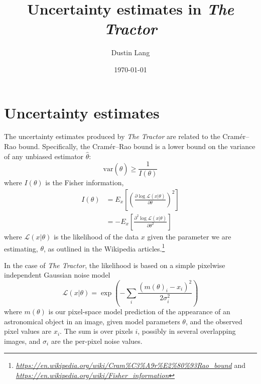 \documentclass[letterpaper]{article}
\newcommand{\likelihood}{\mathcal{L}}
\newcommand{\dd}{\partial}
\newcommand{\var}{\textrm{var}}
\newcommand{\niceurl}[1]{\mbox{\href{#1}{\textsl{#1}}}}
\begin{document}
\title{Uncertainty estimates in \emph{The Tractor}}
\author{Dustin Lang}
\date{\today}

\maketitle

\section{Uncertainty estimates}

The uncertainty estimates produced by \emph{The Tractor} are related
to the Cram\'er--Rao bound.  Specifically, the Cram\'er--Rao bound is
a lower bound on the variance of any unbiased estimator $\hat{\theta}$:
\begin{equation}
\var(\hat{\theta}) \ge \displaystyle\frac{1}{I(\theta)}
\end{equation}
where $I(\theta)$ is the Fisher information,
\begin{align}
  I(\theta) &= E_{x}\left[ \left( \frac{\dd \log \likelihood(x | \theta)}{\dd \theta} \right)^2 \right] \\
  & = - E_{x}\left[ \frac{\dd^2 \log \likelihood(x | \theta)}{\dd \theta^2} \right]
\end{align}
where $\likelihood(x | \theta)$ is the likelihood of the data $x$ given
the parameter we are estimating, $\theta$,
as outlined in the Wikipedia articles.\footnote{%
  \niceurl{https://en.wikipedia.org/wiki/Cram\%C3\%A9r\%E2\%80\%93Rao\_bound}
  and
  \niceurl{https://en.wikipedia.org/wiki/Fisher\_information}}


In the case of \emph{The Tractor}, the likelihood is based on a simple
pixelwise independent Gaussian noise model
\begin{equation}
\likelihood(x | \theta) = \exp\left(-\sum_i \frac{(m(\theta)_i - x_i)^2}{2 \sigma_i^2} \right)
\end{equation}
where $m(\theta)$ is our pixel-space model prediction of the
appearance of an astronomical object in an image, given model
parameters $\theta$, and the observed pixel values are $x_i$.  The sum
is over pixels $i$, possibly in several overlapping images, and
$\sigma_i$ are the per-pixel noise values.
\end{document}
